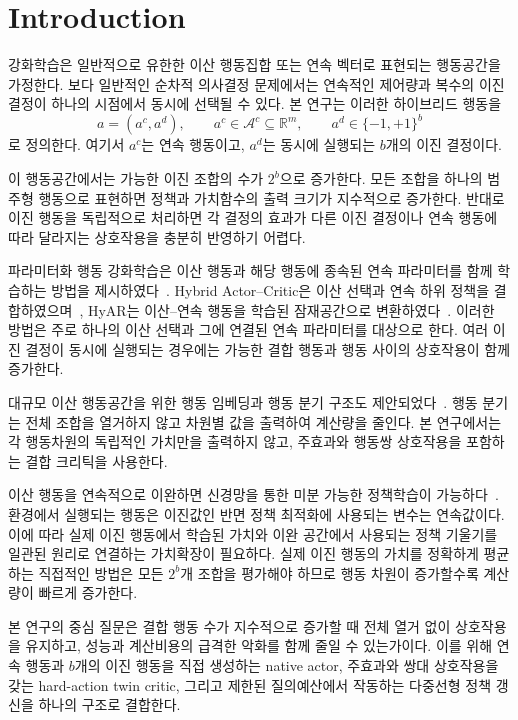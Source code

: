 \documentclass[10pt,journal]{IEEEtran}
\newcommand{\R}{\mathbb{R}}
\newcommand{\A}{\mathcal{A}}
\begin{document}
\IEEEpeerreviewmaketitle


\section{Introduction}
\label{sec:introduction}

강화학습은 일반적으로 유한한 이산 행동집합 또는 연속 벡터로 표현되는 행동공간을 가정한다. 보다 일반적인 순차적 의사결정 문제에서는 연속적인 제어량과 복수의 이진 결정이 하나의 시점에서 동시에 선택될 수 있다. 본 연구는 이러한 하이브리드 행동을
\begin{equation}
a=(a^c,a^d),\qquad
a^c\in\A^c\subseteq\R^m,\qquad
a^d\in\{-1,+1\}^b
\label{eq:hybrid-action}
\end{equation}
로 정의한다. 여기서 $a^c$는 연속 행동이고, $a^d$는 동시에 실행되는 $b$개의 이진 결정이다.

이 행동공간에서는 가능한 이진 조합의 수가 $2^b$으로 증가한다. 모든 조합을 하나의 범주형 행동으로 표현하면 정책과 가치함수의 출력 크기가 지수적으로 증가한다. 반대로 이진 행동을 독립적으로 처리하면 각 결정의 효과가 다른 이진 결정이나 연속 행동에 따라 달라지는 상호작용을 충분히 반영하기 어렵다.

파라미터화 행동 강화학습은 이산 행동과 해당 행동에 종속된 연속 파라미터를 함께 학습하는 방법을 제시하였다~\cite{masson2016,xiong2018,bester2019}. Hybrid Actor--Critic은 이산 선택과 연속 하위 정책을 결합하였으며~\cite{fan2019}, HyAR는 이산--연속 행동을 학습된 잠재공간으로 변환하였다~\cite{li2022hyar}. 이러한 방법은 주로 하나의 이산 선택과 그에 연결된 연속 파라미터를 대상으로 한다. 여러 이진 결정이 동시에 실행되는 경우에는 가능한 결합 행동과 행동 사이의 상호작용이 함께 증가한다.

대규모 이산 행동공간을 위한 행동 임베딩과 행동 분기 구조도 제안되었다~\cite{dulacarnold2015,tavakoli2018}. 행동 분기는 전체 조합을 열거하지 않고 차원별 값을 출력하여 계산량을 줄인다. 본 연구에서는 각 행동차원의 독립적인 가치만을 출력하지 않고, 주효과와 행동쌍 상호작용을 포함하는 결합 크리틱을 사용한다.

이산 행동을 연속적으로 이완하면 신경망을 통한 미분 가능한 정책학습이 가능하다~\cite{jang2017,maddison2017}. 환경에서 실행되는 행동은 이진값인 반면 정책 최적화에 사용되는 변수는 연속값이다. 이에 따라 실제 이진 행동에서 학습된 가치와 이완 공간에서 사용되는 정책 기울기를 일관된 원리로 연결하는 가치확장이 필요하다. 실제 이진 행동의 가치를 정확하게 평균하는 직접적인 방법은 모든 $2^b$개 조합을 평가해야 하므로 행동 차원이 증가할수록 계산량이 빠르게 증가한다.

본 연구의 중심 질문은 결합 행동 수가 지수적으로 증가할 때 전체 열거 없이 상호작용을 유지하고, 성능과 계산비용의 급격한 악화를 함께 줄일 수 있는가이다. 이를 위해 연속 행동과 $b$개의 이진 행동을 직접 생성하는 native actor, 주효과와 쌍대 상호작용을 갖는 hard-action twin critic, 그리고 제한된 질의예산에서 작동하는 다중선형 정책 갱신을 하나의 구조로 결합한다.
\end{document}
